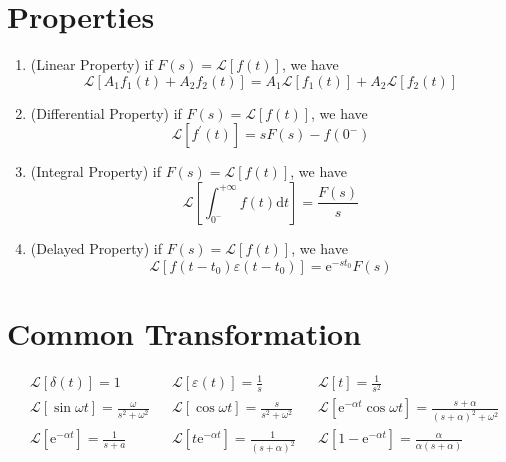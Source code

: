 \documentclass[12pt,a4paper]{article}
\begin{document}
	\section{Properties}
	\begin{enumerate}
		\item (Linear Property) if $\displaystyle F\left( s \right) =\mathcal{L} \left[ f\left( t \right) \right] $, we have
		$$
		\mathcal{L} [A_1f_1(t)+A_2f_2(t)]=A_1\mathcal{L} \left[ f_1\left( t \right) \right] +A_2\mathcal{L} \left[ f_2(t) \right] 
		$$
		\item (Differential Property) if $\displaystyle F\left( s \right) =\mathcal{L} \left[ f\left( t \right) \right] $, we have
		$$
		\mathcal{L} \left[ f^{\prime}\left( t \right) \right] =sF\left( s \right) -f\left( 0^- \right) 
		$$
		\item (Integral Property) if $\displaystyle F\left( s \right) =\mathcal{L} \left[ f\left( t \right) \right] $, we have
		$$
		\mathcal{L} \left[ \int_{0^-}^{+\infty}{f\left( t \right) \mathrm{d}t} \right] =\frac{F\left( s \right)}{s}
		$$
		\item  (Delayed Property) if $\displaystyle F\left( s \right) =\mathcal{L} \left[ f\left( t \right) \right] $, we have
		$$
		\mathcal{L} [f(t-t_0)\varepsilon (t-t_0)]=\mathrm{e}^{-st_0}F(s)
		$$
	\end{enumerate}
	\section{Common Transformation}
	\begin{align*}
		&\mathcal{L} \left[ \delta \left( t \right) \right] =1
		&&\mathcal{L} \left[ \varepsilon \left( t \right) \right] =\frac{1}{s}
		&&\mathcal{L} \left[ t \right] =\frac{1}{s^2}
		\\
		&\mathcal{L} \left[ \sin \omega t \right] =\frac{\omega}{s^2+\omega ^2}
		&&\mathcal{L} \left[ \cos \omega t \right] =\frac{s}{s^2+\omega ^2}
		&&\mathcal{L} \left[ \mathrm{e}^{-\alpha t}\cos \omega t \right] =\frac{s+\alpha}{\left( s+\alpha \right) ^2+\omega ^2}
		\\
		&\mathcal{L} \left[ \mathrm{e}^{-\alpha t} \right] =\frac{1}{s+a}
		&&\mathcal{L} \left[ t\mathrm{e}^{-\alpha t} \right] =\frac{1}{\left( s+\alpha \right) ^2}
		&&\mathcal{L} \left[ 1-\mathrm{e}^{-\alpha t} \right] =\frac{\alpha}{\alpha \left( s+\alpha \right)}
	\end{align*}
\end{document}
